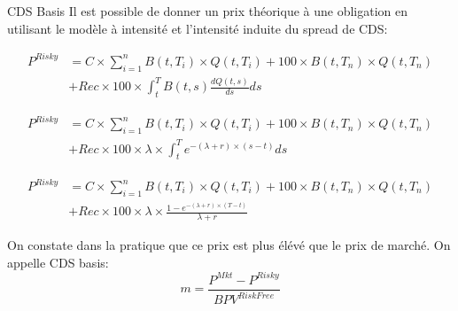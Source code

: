 \documentclass{beamer}
\begin{document}
\begin{frame}{CDS Basis}
Il est possible de donner un prix théorique à une obligation en utilisant le modèle à intensité et l'intensité induite du spread de CDS:\\
\begin{overprint}
\begin{align*}
P^{Risky}&=C \times \sum_{i=1}^{n} B(t,T_i) \times Q(t,T_i) + 100 \times B(t,T_n) \times Q(t,T_n)\\
&+Rec \times 100 \times \int_{t}^{T} B(t,s) \frac{dQ(t,s)}{ds}ds
\end{align*}

\begin{align*}
P^{Risky}&=C \times \sum_{i=1}^{n} B(t,T_i) \times Q(t,T_i) + 100 \times B(t,T_n) \times Q(t,T_n)\\
&+Rec\times 100 \times \lambda \times \int_{t}^{T} e^{-(\lambda+r) \times (s-t)}ds
\end{align*}

\begin{align*}
P^{Risky}&=C \times \sum_{i=1}^{n} B(t,T_i) \times Q(t,T_i) + 100 \times B(t,T_n) \times Q(t,T_n)\\
&+Rec \times 100 \times \lambda \times\frac{ 1-e^{-(\lambda+r) \times (T-t)}}{\lambda+r}
\end{align*}
\end{overprint}
 On constate dans la pratique que ce prix est plus élévé que le prix de marché. On appelle CDS basis:\\ 
\[
m=\frac{P^{Mkt}-P^{Risky}}{BPV^{Risk Free}}
\]
\end{frame}
\end{document}
